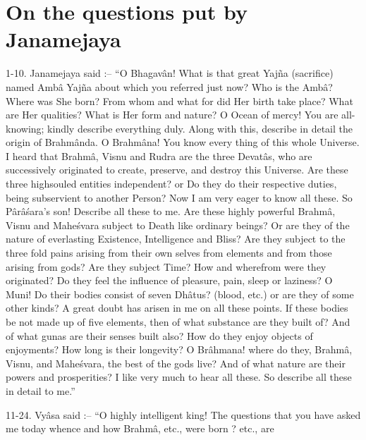 ﻿\chapter{On the questions put by Janamejaya}

1-10. Janamejaya said :-- ``O Bhagav\^an! What is that great Yaj\~na (sacrifice) named Amb\^a Yaj\~na about which you referred just now? Who is the Amb\^a? Where was She born? From whom and what for did Her birth take place? What are Her qualities? What is Her form and nature? O Ocean of mercy! You are all-knowing; kindly describe everything duly. Along with this, describe in detail the origin of Brahm\^anda. O Brahm\^ana! You know every thing of this whole Universe. I heard that Brahm\^a, Visnu and Rudra are the three Devat\^as, who are successively originated to create, preserve, and destroy this Universe. Are these three highsouled entities independent? or Do they do their respective duties, being subservient to another Person? Now I am very eager to know all these. So P\^ar\^a\'sara's son! Describe all these to me. Are these highly powerful Brahm\^a, Visnu and Mahe\'svara subject to Death like ordinary beings? Or are they of the nature of everlasting Existence, Intelligence and Bliss? Are they subject to the three fold pains arising from their own selves from elements and from those arising from gods? Are they subject Time? How and wherefrom were they originated? Do they feel the influence of pleasure, pain, sleep or laziness? O Muni! Do their bodies consist of seven Dh\^atus? (blood, etc.) or are they of some other kinds? A great doubt has arisen in me on all these points. If these bodies be not made up of five elements, then of what substance are they built of? And of what gunas are their senses built also? How do they enjoy objects of enjoyments? How long is their longevity? O Br\^ahmana! where do they, Brahm\^a, Visnu, and Mahe\'svara, the best of the gods live? And of what nature are their powers and prosperities? I like very much to hear all these. So describe all these in detail to me.''

11-24. Vy\^asa said :-- ``O highly intelligent king! The questions that you have asked me today whence and how Brahm\^a, etc., were born ? etc., are

